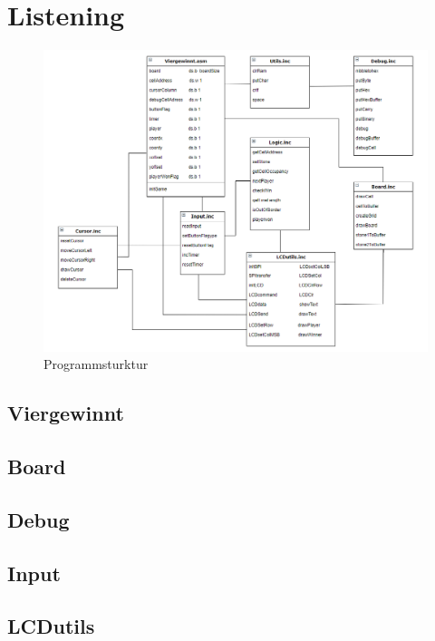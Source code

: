 \newpage
\chapter{Listening}
    \begin{figure}[H]
        \centering
        \includegraphics[scale=0.5]{img/programmstruktur.png}    
        \caption{Programmsturktur}
        \label{fig:programmsturktur}
    \end{figure}
    \newpage
    \section{Viergewinnt}
        
    \newpage
    \section{Board}
        
    \newpage
    \section{Debug}
        
    \newpage
    \section{Input}
        
    \newpage
    \section{LCDutils}
        
    \newpage
